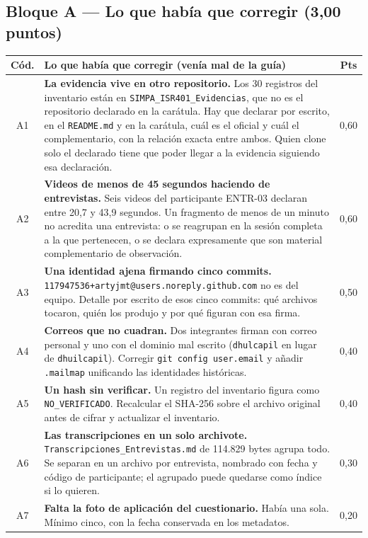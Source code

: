 \documentclass[11pt,a4paper]{article}
\newcommand{\cabA}{\toprule \textbf{Cód.} & \textbf{Lo que había que corregir (venía mal de la guía)} & \textbf{Pts} \\ \midrule}
\begin{document}
\subsection*{Bloque A — Lo que había que corregir (3,00 puntos)}
\begin{xltabular}{\textwidth}{@{}c>{\raggedright\arraybackslash}X c@{}}
\cabA
A1 & \textbf{La evidencia vive en otro repositorio.} Los 30 registros del inventario están en \texttt{SIMPA\_ISR401\_Evidencias}, que no es el repositorio declarado en la carátula. Hay que declarar por escrito, en el \texttt{README.md} y en la carátula, cuál es el oficial y cuál el complementario, con la relación exacta entre ambos. Quien clone solo el declarado tiene que poder llegar a la evidencia siguiendo esa declaración. & 0{,}60 \\ \addlinespace
A2 & \textbf{Videos de menos de 45 segundos haciendo de entrevistas.} Seis videos del participante ENTR-03 declaran entre 20,7 y 43,9 segundos. Un fragmento de menos de un minuto no acredita una entrevista: o se reagrupan en la sesión completa a la que pertenecen, o se declara expresamente que son material complementario de observación. & 0{,}60 \\ \addlinespace
A3 & \textbf{Una identidad ajena firmando cinco commits.} \texttt{117947536+artyjmt@users.noreply.github.com} no es del equipo. Detalle por escrito de esos cinco commits: qué archivos tocaron, quién los produjo y por qué figuran con esa firma. & 0{,}50 \\ \addlinespace
A4 & \textbf{Correos que no cuadran.} Dos integrantes firman con correo personal y uno con el dominio mal escrito (\texttt{dhulcapil} en lugar de \texttt{dhuilcapil}). Corregir \texttt{git config user.email} y añadir \texttt{.mailmap} unificando las identidades históricas. & 0{,}40 \\ \addlinespace
A5 & \textbf{Un hash sin verificar.} Un registro del inventario figura como \texttt{NO\_VERIFICADO}. Recalcular el SHA-256 sobre el archivo original antes de cifrar y actualizar el inventario. & 0{,}40 \\ \addlinespace
A6 & \textbf{Las transcripciones en un solo archivote.} \texttt{Transcripciones\_Entrevistas.md} de 114.829 bytes agrupa todo. Se separan en un archivo por entrevista, nombrado con fecha y código de participante; el agrupado puede quedarse como índice si lo quieren. & 0{,}30 \\ \addlinespace
A7 & \textbf{Falta la foto de aplicación del cuestionario.} Había una sola. Mínimo cinco, con la fecha conservada en los metadatos. & 0{,}20 \\
\bottomrule
\end{xltabular}
\end{document}
